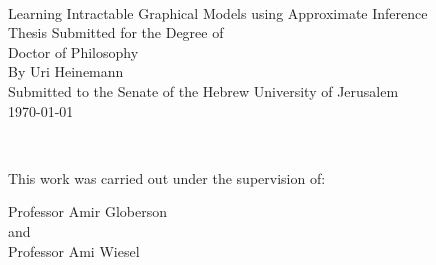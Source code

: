 \begin{titlepage}
\begin{center}

~\\[2cm]
{\Huge Learning Intractable Graphical Models using Approximate Inference }\\[3cm]
{\large Thesis Submitted for the Degree of \\
	Doctor of Philosophy}\\[0.5cm]
{\large By Uri Heinemann}\\[8cm]


\vfill
{\large Submitted to the Senate of the Hebrew University of Jerusalem}\\[0.5cm]
\mydate
{\large  \today }
\end{center}
\end{titlepage}
\clearpage
\mbox{}
\newpage
\begin{center}
~\\[1cm]
{\large This work was carried out under the supervision of:\\[0.7cm]
\begin{minipage}{0.4\textwidth}
Professor Amir Globerson\\
and\\
Professor Ami Wiesel\\

\end{minipage}}
\end{center}
\clearpage
